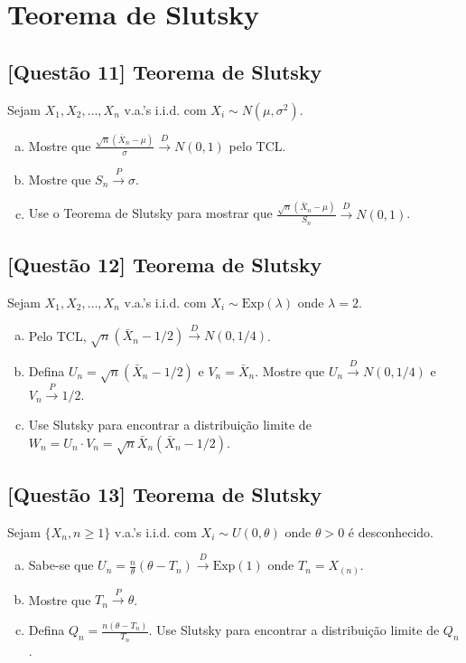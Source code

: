 \documentclass[12pt,a4paper]{article}
\begin{document}
\section{Teorema de Slutsky}

\subsection*{[Questão 11] Teorema de Slutsky}

Sejam $X_1, X_2, \ldots, X_n$ v.a.'s i.i.d. com $X_i \sim N(\mu, \sigma^2)$.

\begin{enumerate}[(a)]
    \item Mostre que $\frac{\sqrt{n}(\bar{X}_n - \mu)}{\sigma} \xrightarrow{D} N(0,1)$ pelo TCL.
    \item Mostre que $S_n \xrightarrow{P} \sigma$.
    \item Use o Teorema de Slutsky para mostrar que $\frac{\sqrt{n}(\bar{X}_n - \mu)}{S_n} \xrightarrow{D} N(0,1)$.
\end{enumerate}

\subsection*{[Questão 12] Teorema de Slutsky}

Sejam $X_1, X_2, \ldots, X_n$ v.a.'s i.i.d. com $X_i \sim \text{Exp}(\lambda)$ onde $\lambda = 2$.

\begin{enumerate}[(a)]
    \item Pelo TCL, $\sqrt{n}(\bar{X}_n - 1/2) \xrightarrow{D} N(0, 1/4)$.
    \item Defina $U_n = \sqrt{n}(\bar{X}_n - 1/2)$ e $V_n = \bar{X}_n$. Mostre que $U_n \xrightarrow{D} N(0, 1/4)$ e $V_n \xrightarrow{P} 1/2$.
    \item Use Slutsky para encontrar a distribuição limite de $W_n = U_n \cdot V_n = \sqrt{n}\bar{X}_n(\bar{X}_n - 1/2)$.
\end{enumerate}

\subsection*{[Questão 13] Teorema de Slutsky}

Sejam $\{X_n, n \geq 1\}$ v.a.'s i.i.d. com $X_i \sim U(0, \theta)$ onde $\theta > 0$ é desconhecido.

\begin{enumerate}[(a)]
    \item Sabe-se que $U_n = \frac{n}{\theta}(\theta - T_n) \xrightarrow{D} \text{Exp}(1)$ onde $T_n = X_{(n)}$.
    \item Mostre que $T_n \xrightarrow{P} \theta$.
    \item Defina $Q_n = \frac{n(\theta - T_n)}{T_n}$. Use Slutsky para encontrar a distribuição limite de $Q_n$.
\end{enumerate}
\end{document}
